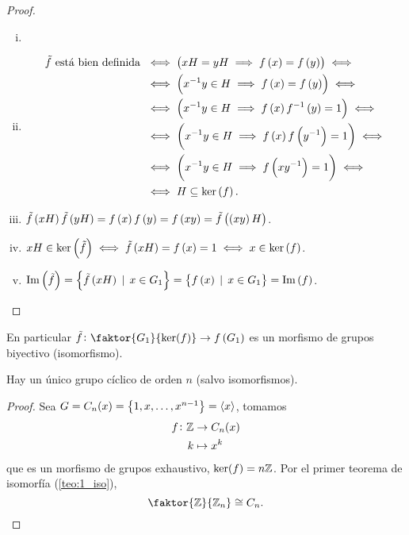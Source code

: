\begin{proof}
    \begin{enumerate}[i)]
        \item[]
        \item 
            \begin{align*}
                \tilde{f}\text{ está bien definida } &\iff \left( xH=yH\implies f\left( x\right) = f\left( y\right) \right) \iff \\
                &\iff \left( x^{-1}y\in H \implies f\left( x\right) = f\left( y\right) \right) \iff \\
                &\iff \left( x^{-1}y\in H \implies f\left( x\right) f^{-1}\left( y\right) = 1 \right) \iff \\
                &\iff \left( x^{-1}y\in H \implies f\left( x\right) f\left( y^{-1}\right) = 1 \right) \iff \\
                &\iff \left( x^{-1}y\in H \implies f\left( x y^{-1}\right) = 1 \right) \iff \\
                &\iff H\subseteq \ker\left( f\right).
            \end{align*}
        \item $\tilde{f}\left( xH\right)\tilde{f}\left( yH\right)=f\left( x\right) f\left( y\right) = f\left( xy\right) = \tilde{f}\left( \left( xy\right) H\right)$.
        \item $xH\in\ker\left(\tilde{f}\right)\iff\tilde{f}\left( xH\right) = f\left( x\right) = 1\iff x\in\ker\left( f\right)$.
        \item $\operatorname{Im}\left(\tilde{f}\right)=\left\{ \tilde{f}\left( xH\right) \,\mid\, x\in G_1\right\} =\left\{ f\left( x\right) \,\mid\, x\in G_1\right\} = \operatorname{Im}\left( f\right)$.
    \end{enumerate}

\end{proof}

\begin{col}
    En particular $\tilde{f} \colon \faktor{G_1}{\ker(f)} \to f\left( G_1 \right)$ es un morfismo de
    grupos biyectivo (isomorfismo).
\end{col}

\begin{col}
    Hay un único grupo cíclico de orden $n$ (salvo isomorfismos).
\end{col}

\begin{proof}
    Sea $G = C_n(x) = \left\{ 1, x, \dots, x^{n-1}\right\} = \langle x \rangle$, tomamos
    \[
        \begin{aligned}
            f \colon \mathbb{Z} &\to C_n(x) \\
            k &\mapsto x^k
        \end{aligned}
    \]
    que es un morfismo de grupos exhaustivo, $\ker(f) = n\mathbb{Z}$. Por el primer teorema de isomorfía (\ref{teo:1_iso}),
    \[
        \faktor{\z}{\z_{n}} \cong C_n.
    \]
\end{proof}

